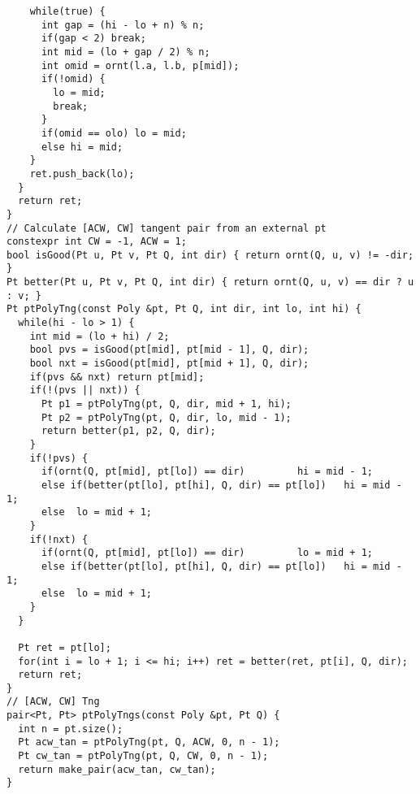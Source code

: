 \documentclass[FSZ,a4paper,onesided]{article}
\begin{document}
\begin{multicols*}{\COLS}
\begin{lstlisting}
    while(true) {
      int gap = (hi - lo + n) % n;
      if(gap < 2) break;
      int mid = (lo + gap / 2) % n;
      int omid = ornt(l.a, l.b, p[mid]);
      if(!omid) {
        lo = mid;
        break;
      }
      if(omid == olo) lo = mid;
      else hi = mid;
    }
    ret.push_back(lo);
  }
  return ret;
}
// Calculate [ACW, CW] tangent pair from an external pt
constexpr int CW = -1, ACW = 1;
bool isGood(Pt u, Pt v, Pt Q, int dir) { return ornt(Q, u, v) != -dir; }
Pt better(Pt u, Pt v, Pt Q, int dir) { return ornt(Q, u, v) == dir ? u : v; }
Pt ptPolyTng(const Poly &pt, Pt Q, int dir, int lo, int hi) {
  while(hi - lo > 1) {
    int mid = (lo + hi) / 2;
    bool pvs = isGood(pt[mid], pt[mid - 1], Q, dir);
    bool nxt = isGood(pt[mid], pt[mid + 1], Q, dir);
    if(pvs && nxt) return pt[mid];
    if(!(pvs || nxt)) {
      Pt p1 = ptPolyTng(pt, Q, dir, mid + 1, hi);
      Pt p2 = ptPolyTng(pt, Q, dir, lo, mid - 1);
      return better(p1, p2, Q, dir);
    }
    if(!pvs) {
      if(ornt(Q, pt[mid], pt[lo]) == dir)         hi = mid - 1;
      else if(better(pt[lo], pt[hi], Q, dir) == pt[lo])   hi = mid - 1;
      else  lo = mid + 1;
    }
    if(!nxt) {
      if(ornt(Q, pt[mid], pt[lo]) == dir)         lo = mid + 1;
      else if(better(pt[lo], pt[hi], Q, dir) == pt[lo])   hi = mid - 1;
      else  lo = mid + 1;
    }
  }

  Pt ret = pt[lo];
  for(int i = lo + 1; i <= hi; i++) ret = better(ret, pt[i], Q, dir);
  return ret;
}
// [ACW, CW] Tng
pair<Pt, Pt> ptPolyTngs(const Poly &pt, Pt Q) {
  int n = pt.size();
  Pt acw_tan = ptPolyTng(pt, Q, ACW, 0, n - 1);
  Pt cw_tan = ptPolyTng(pt, Q, CW, 0, n - 1);
  return make_pair(acw_tan, cw_tan);
}
\end{lstlisting}

\end{multicols*}
\end{document}

